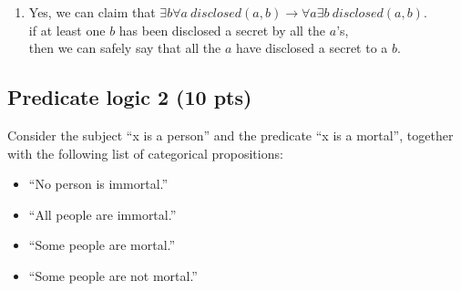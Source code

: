 \documentclass[12pt]{article}
\begin{document}
\begin{enumerate}
	\subitem  
\item Yes, we can claim that $\exists b \forall a ~disclosed(a, b) \rightarrow \forall a \exists b~disclosed(a, b)$.\\
 if at least one $b$ has been disclosed a secret by all the $a$'s,\\ 
 then we can safely say that all the $a$ have disclosed a secret to a $b$.
\end{enumerate} 


\newpage

\subsection{Predicate logic 2 (10 pts)}

\noindent Consider the subject ``x is a person'' and the predicate ``x is a mortal'', together with the following list of categorical propositions:
\begin{itemize}
\item ``No person is immortal.''

\item ``All people are immortal.''

\item ``Some people are mortal.''	

\item ``Some people are not mortal.''	
\end{itemize} 
\end{document}
